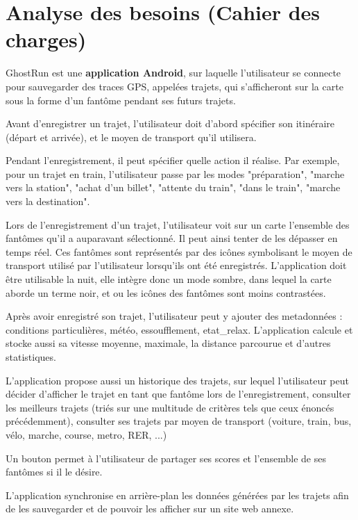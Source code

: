\chapter{Analyse des besoins (Cahier des charges)}

GhostRun est une \textbf{application Android}, sur laquelle l'utilisateur se connecte pour sauvegarder des traces GPS, appelées trajets, qui s'afficheront sur la carte sous la forme d'un \gls{fantôme} pendant ses futurs trajets.

Avant d'enregistrer un trajet, l'utilisateur doit d'abord spécifier son itinéraire (départ et arrivée), et le moyen de transport qu'il utilisera. 

Pendant l'enregistrement, il peut spécifier quelle action il réalise. Par exemple, pour un trajet en train, l'utilisateur passe par les modes "préparation", "marche vers la station", "achat d'un billet", "attente du train", "dans le train", "marche vers la destination".

Lors de l'enregistrement d'un trajet, l'utilisateur voit sur un carte l'ensemble des \glspl{fantôme} qu'il a auparavant sélectionné. Il peut ainsi tenter de les dépasser en temps réel. Ces \glspl{fantôme} sont représentés par des icônes symbolisant le moyen de transport utilisé par l'utilisateur lorsqu'ils ont été enregistrés. L'application doit être utilisable la nuit, elle intègre donc un mode sombre, dans lequel la carte aborde un terme noir, et ou les icônes des \glspl{fantôme} sont moins contrastées.

Après avoir enregistré son trajet, l'utilisateur peut y ajouter des metadonnées : conditions particulières, météo, essoufflement, \gls{etat_relax}. L'application calcule et stocke aussi sa vitesse moyenne, maximale, la distance parcourue et d'autres statistiques.

L'application propose aussi un historique des trajets, sur lequel l'utilisateur peut décider d'afficher le trajet en tant que \gls{fantôme} lors de l'enregistrement, consulter les meilleurs trajets (triés sur une multitude de critères tels que ceux énoncés précédemment), consulter ses trajets par moyen de transport (voiture, train, bus, vélo, marche, course, metro, RER, ...)

Un bouton permet à l'utilisateur de partager ses scores et l'ensemble de ses \glspl{fantôme} si il le désire.

L'application synchronise en arrière-plan les données générées par les trajets afin de les sauvegarder et de pouvoir les afficher sur un site web annexe.

